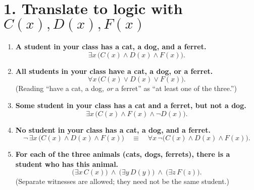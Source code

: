 \section*{1. Translate to logic with $C(x),D(x),F(x)$}

\begin{enumerate}[label=(\alph*),leftmargin=*]

\item \textbf{A student in your class has a cat, a dog, and a ferret.}
\[
\exists x\,\bigl(C(x)\land D(x)\land F(x)\bigr).
\]

\item \textbf{All students in your class have a cat, a dog, or a ferret.}
\[
\forall x\,\bigl(C(x)\lor D(x)\lor F(x)\bigr).
\]
(Reading “have a cat, a dog, \emph{or} a ferret” as “at least one of the three.”)

\item \textbf{Some student in your class has a cat and a ferret, but not a dog.}
\[
\exists x\,\bigl(C(x)\land F(x)\land \lnot D(x)\bigr).
\]

\item \textbf{No student in your class has a cat, a dog, and a ferret.}
\[
\lnot\,\exists x\,\bigl(C(x)\land D(x)\land F(x)\bigr)
\quad\equiv\quad
\forall x\,\lnot\bigl(C(x)\land D(x)\land F(x)\bigr).
\]

\item \textbf{For each of the three animals (cats, dogs, ferrets), there is a student who has this animal.}
\[
\bigl(\exists x\,C(x)\bigr)\ \land\ \bigl(\exists y\,D(y)\bigr)\ \land\ \bigl(\exists z\,F(z)\bigr).
\]
(Separate witnesses are allowed; they need not be the same student.)

\end{enumerate}
